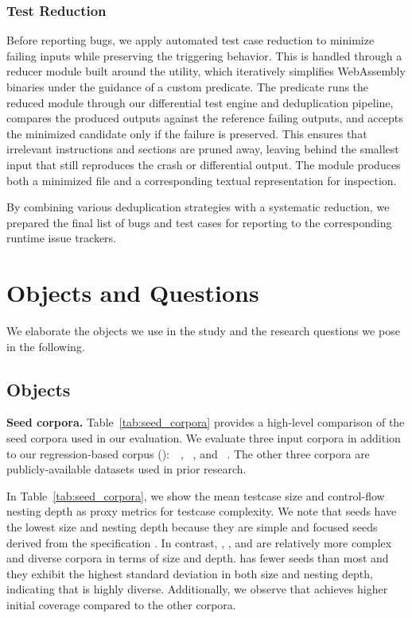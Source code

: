 \documentclass[lettersize,journal]{IEEEtran}
\begin{document}
\subsubsection{Test Reduction} Before reporting bugs, we apply automated test case reduction to minimize failing inputs while preserving the triggering behavior. This is handled through a reducer module built around the  utility, which iteratively simplifies WebAssembly binaries under the guidance of a custom predicate. The predicate runs the reduced module through our differential test engine and deduplication pipeline, compares the produced outputs against the reference failing outputs, and accepts the minimized candidate only if the failure is preserved. This ensures that irrelevant instructions and sections are pruned away, leaving behind the smallest input that still reproduces the crash or differential output. The module produces both a minimized  file and a corresponding textual  representation for inspection.

By combining various deduplication strategies with a systematic reduction, we prepared the final list of bugs and test cases for reporting to the corresponding runtime issue trackers.

\section{Objects and Questions}
\label{sec:experiment}

We elaborate the objects we use in the study and the research questions we pose in the following.

\subsection{Objects}

\noindent\textbf{Seed corpora.}
\label{sec:seed_corpora}
Table~\ref{tab:seed_corpora} provides a high-level comparison of the seed corpora used in our evaluation. We evaluate three input corpora
in addition to our regression-based corpus (\rtbench{}):~\llvmbench{}~\cite{zhao2024wapplique},  \wasmbench{}~\cite{hilbig2021empirical, cao2024wasmaker}, and \specbench{}~\cite{zhou2023wadiff}.
The other three corpora are publicly-available \wasm{} datasets used in prior research.

In Table~\ref{tab:seed_corpora}, we show the mean testcase size and control-flow nesting depth as proxy metrics for testcase complexity. We note that \specbench{} seeds have the lowest size and nesting depth because they are simple and focused seeds derived from the \wasm{} specification \cite{zhou2023wadiff}. In contrast, \llvmbench{}, \wasmbench{}, and \rtbench{} are relatively more complex and diverse corpora in terms of size and depth. \rtbench{} has fewer seeds than most and they exhibit the highest standard deviation in both size and nesting depth, indicating that \rtbench{} is highly diverse. Additionally, we observe that \rtbench{} achieves higher initial coverage compared to the other corpora. 
\end{document}
